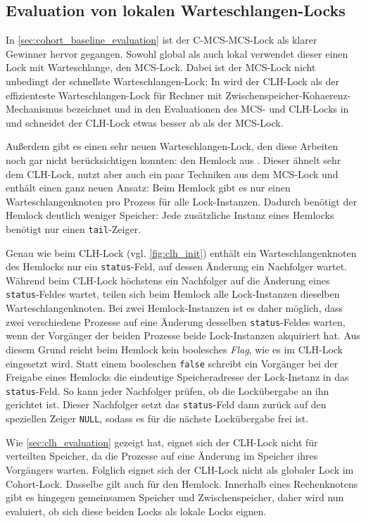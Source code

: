 \subsection{Evaluation von lokalen Warteschlangen-Locks}
\label{sec:cohort_hem}

In \autoref{sec:cohort_baseline_evaluation} ist der C-MCS-MCS-Lock als klarer Gewinner hervor gegangen.
Sowohl global als auch lokal verwendet dieser einen Lock mit Warteschlange,
den MCS-Lock.
Dabei ist der MCS-Lock nicht unbedingt der schnellste Warteschlangen-Lock:
In \cite{HCLH-Lock} wird der CLH-Lock als der effizienteste Warteschlangen-Lock
für Rechner mit \gls{Zwischenspeicher}-\gls{Kohaerenz}-Mechanismus bezeichnet
und in den Evaluationen des MCS- und CLH-Locks
in \cite{RH-Lock} und \cite{FC-MCS-Lock}
schneidet der CLH-Lock etwas besser ab
als der MCS-Lock.

Außerdem gibt es einen sehr neuen Warteschlangen-Lock,
den diese Arbeiten noch gar nicht berücksichtigen konnten:
den Hemlock aus \cite{Hemlock}.
Dieser ähnelt sehr dem CLH-Lock,
nutzt aber auch ein paar Techniken aus dem MCS-Lock
und enthält einen ganz neuen Ansatz:
Beim Hemlock gibt es nur einen Warteschlangenknoten pro Prozess für alle Lock-Instanzen.
Dadurch benötigt der Hemlock deutlich weniger Speicher:
Jede zusätzliche Instanz eines Hemlocks benötigt nur einen \texttt{tail}-Zeiger.

Genau wie beim CLH-Lock (vgl. \autoref{fig:clh_init})
enthält ein Warteschlangenknoten des Hemlocks nur ein \texttt{status}-Feld,
auf dessen Änderung ein Nachfolger wartet.
Während beim CLH-Lock höchstens ein Nachfolger auf die Änderung eines \texttt{status}-Feldes wartet,
teilen sich beim Hemlock alle Lock-Instanzen dieselben Warteschlangenknoten.
Bei zwei Hemlock-Instanzen ist es daher möglich,
dass zwei verschiedene Prozesse auf eine Änderung desselben \texttt{status}-Feldes warten,
wenn der Vorgänger der beiden Prozesse beide Lock-Instanzen akquiriert hat.
Aus diesem Grund reicht beim Hemlock kein boolesches \textit{Flag},
wie es im CLH-Lock eingesetzt wird.
Statt einem booleschen \texttt{false}
schreibt ein Vorgänger bei der Freigabe eines Hemlocks die eindeutige Speicheradresse der Lock-Instanz in das \texttt{status}-Feld.
So kann jeder Nachfolger prüfen,
ob die Lockübergabe an ihn gerichtet ist.
Dieser Nachfolger setzt das \texttt{status}-Feld dann zurück auf den speziellen Zeiger \texttt{NULL},
sodass es für die nächste Lockübergabe frei ist.

Wie \autoref{sec:clh_evaluation} gezeigt hat,
eignet sich der CLH-Lock nicht für verteilten Speicher,
da die Prozesse auf eine Änderung im Speicher ihres Vorgängers warten.
Folglich eignet sich der CLH-Lock nicht als globaler Lock im Cohort-Lock.
Dasselbe gilt auch für den Hemlock.
Innerhalb eines Rechenknotens gibt es hingegen gemeinsamen Speicher und \gls{Zwischenspeicher},
daher wird nun evaluiert,
ob sich diese beiden Locks als lokale Locks eignen.

